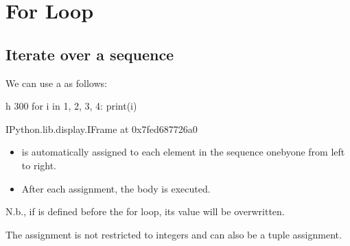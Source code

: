\documentclass[letterpaper,10pt,english]{sphinxmanual}
\begin{document}
\section{For Loop}
\label{\detokenize{Lecture3/Iteration:for-loop}}

\subsection{Iterate over a sequence}
\label{\detokenize{Lecture3/Iteration:iterate-over-a-sequence}}

We can use a  as follows:

\begin{sphinxVerbatim}[commandchars=\\\{\}]
 \PYGZhy{}h 300
for i in 1, 2, 3, 4:
    print(i)
\end{sphinxVerbatim}

\begin{sphinxVerbatim}[commandchars=\\\{\}]
\PYGZlt{}IPython.lib.display.IFrame at 0x7fed687726a0\PYGZgt{}
\end{sphinxVerbatim}
\begin{itemize}
\item {} 
 is automatically assigned to each element in the sequence  one\sphinxhyphen{}by\sphinxhyphen{}one from left to right.

\item {} 
After each assignment, the body  is executed.

\end{itemize}

N.b., if  is defined before the for loop, its value will be overwritten.

The assignment is not restricted to integers and can also be a tuple assignment.

\begin{sphinxVerbatim}[commandchars=\\\{\}]
     
      
\end{sphinxVerbatim}
\end{document}
